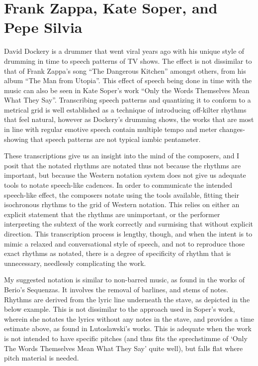 
\section{Frank Zappa, Kate Soper, and Pepe Silvia}
David Dockery is a drummer that went viral years ago with his unique style of drumming in time to speech patterns of TV shows.\autocite[]{daviddockeryPepeSilviaDrums2017}
The effect is not dissimilar to that of Frank Zappa's song ``The Dangerous Kitchen'' amongst others, from his album ``The Man from Utopia''.\autocite[]{zappa}
This effect of speech being done in time with the music can also be seen in Kate Soper's work ``Only the Words Themselves Mean What They Say''.\autocite[]{soper}
Transcribing speech patterns and quantizing it to conform to a metrical grid is well established as a technique of introducing off-kilter rhythms that feel natural, 
however as Dockery's drumming shows, the works that are most in line with regular emotive speech contain multiple tempo and meter changes- 
showing that speech patterns are not typical iambic pentameter.

These transcriptions give us an insight into the mind of the composers, and I posit that the notated rhythms are notated thus not because the rhythms are important, but because the Western notation system does not give us adequate tools to notate speech-like cadences. 
In order to communicate the intended speech-like effect, the composers notate using the tools available, fitting their isochronous rhythms to the grid of Western notation.
This relies on either an explicit statement that the rhythms are unimportant, or the performer interpreting the subtext of the work correctly and surmising that without explicit direction.
This transcription process is lengthy, though, and when the intent is to mimic a relaxed and conversational style of speech, and not to reproduce those exact rhythms as notated, there is a degree of specificity of rhythm that is unnecessary, needlessly complicating the work.

My suggested notation is similar to non-barred music, as found in the works of Berio's Sequenzas.\autocite[]{berio}
It involves the removal of barlines, and stems of notes. 
Rhythms are derived from the lyric line underneath the stave, as depicted in the below example.
This is not dissimilar to the approach used in Soper's work, wherein she notates the lyrics without any notes in the stave, and provides a time estimate above, as found in Lutoslawski's works.\autocite{lutoslawski}
This is adequate when the work is not intended to have specific pitches (and thus fits the sprechstimme of `Only The Words Themselves Mean What They Say' quite well), but falls flat where pitch material is needed.


